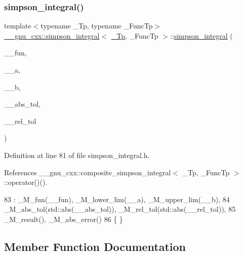 \subsubsection{\texorpdfstring{simpson\+\_\+integral()}{simpson\_integral()}}
{\footnotesize\ttfamily template$<$typename \+\_\+\+Tp, typename \+\_\+\+Func\+Tp$>$ \\
\hyperlink{class____gnu__cxx_1_1simpson__integral}{\+\_\+\+\_\+gnu\+\_\+cxx\+::simpson\+\_\+integral}$<$ \hyperlink{namespace____gnu__cxx_a3b19a9c800ca194374ef9172290f7d79}{\+\_\+\+Tp}, \+\_\+\+Func\+Tp $>$\+::\hyperlink{class____gnu__cxx_1_1simpson__integral}{simpson\+\_\+integral} (\begin{DoxyParamCaption}\item[{\+\_\+\+Func\+Tp}]{\+\_\+\+\_\+fun,  }\item[{\hyperlink{namespace____gnu__cxx_a3b19a9c800ca194374ef9172290f7d79}{\+\_\+\+Tp}}]{\+\_\+\+\_\+a,  }\item[{\hyperlink{namespace____gnu__cxx_a3b19a9c800ca194374ef9172290f7d79}{\+\_\+\+Tp}}]{\+\_\+\+\_\+b,  }\item[{\hyperlink{namespace____gnu__cxx_a3b19a9c800ca194374ef9172290f7d79}{\+\_\+\+Tp}}]{\+\_\+\+\_\+abs\+\_\+tol,  }\item[{\hyperlink{namespace____gnu__cxx_a3b19a9c800ca194374ef9172290f7d79}{\+\_\+\+Tp}}]{\+\_\+\+\_\+rel\+\_\+tol }\end{DoxyParamCaption})\hspace{0.3cm}{\ttfamily [inline]}}



Definition at line 81 of file simpson\+\_\+integral.\+h.



References \+\_\+\+\_\+gnu\+\_\+cxx\+::composite\+\_\+simpson\+\_\+integral$<$ \+\_\+\+Tp, \+\_\+\+Func\+Tp $>$\+::operator()().


\begin{DoxyCode}
83       : \_M\_fun(\_\_fun), \_M\_lower\_lim(\_\_a), \_M\_upper\_lim(\_\_b),
84         \_M\_abs\_tol(std::abs(\_\_abs\_tol)), \_M\_rel\_tol(std::abs(\_\_rel\_tol)),
85         \_M\_result(), \_M\_abs\_error()
86       \{ \}
\end{DoxyCode}


\subsection{Member Function Documentation}
\mbox{\label{class____gnu__cxx_1_1simpson__integral_a879f106bb8f0ef546008c56dfae8696b}} 
